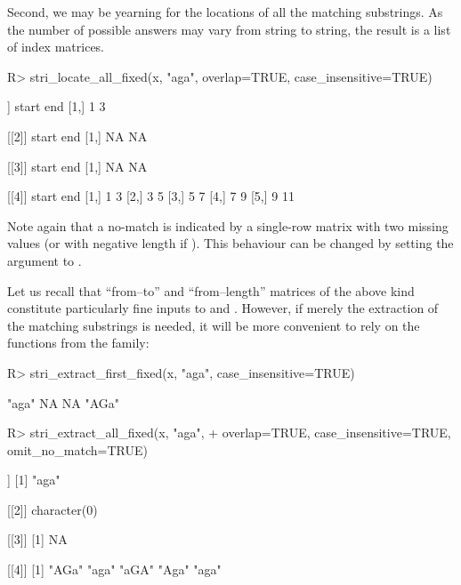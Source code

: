 \documentclass[nojss]{jss}
\begin{document}
Second, we may be yearning for the locations of all the matching
substrings. As the number of possible answers may vary from string to string,
the result is a list of index matrices.

\begin{Schunk}
\begin{Sinput}
R> stri_locate_all_fixed(x, "aga", overlap=TRUE, case_insensitive=TRUE)
\end{Sinput}
\begin{Soutput}
[[1]]
     start end
[1,]     1   3

[[2]]
     start end
[1,]    NA  NA

[[3]]
     start end
[1,]    NA  NA

[[4]]
     start end
[1,]     1   3
[2,]     3   5
[3,]     5   7
[4,]     7   9
[5,]     9  11
\end{Soutput}
\end{Schunk}

\noindent
Note again that a no-match is indicated by a single-row matrix
with two missing values (or with negative length if ).
This behaviour can be changed by setting the 
argument to .


\medskip
Let us recall that ``from--to'' and ``from--length''
matrices of the above kind constitute particularly
fine inputs to  and .
However, if merely the extraction of the matching substrings is needed,
it will be more convenient to rely on the functions from the
 family:

\begin{Schunk}
\begin{Sinput}
R> stri_extract_first_fixed(x, "aga", case_insensitive=TRUE)
\end{Sinput}
\begin{Soutput}
[1] "aga" NA    NA    "AGa"
\end{Soutput}
\begin{Sinput}
R> stri_extract_all_fixed(x, "aga",
+    overlap=TRUE, case_insensitive=TRUE, omit_no_match=TRUE)
\end{Sinput}
\begin{Soutput}
[[1]]
[1] "aga"

[[2]]
character(0)

[[3]]
[1] NA

[[4]]
[1] "AGa" "aga" "aGA" "Aga" "aga"
\end{Soutput}
\end{Schunk}
\end{document}
